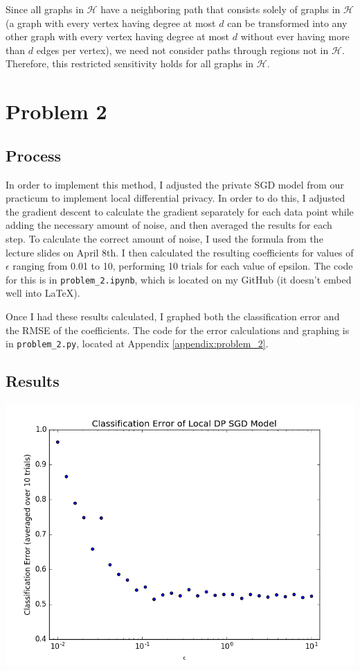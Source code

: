\documentclass[12pt]{article}
\def\cl{\lstinline}
\begin{document}
\bigskip

Since all graphs in $\mathcal{H}$ have a neighboring path that consists solely of graphs in $\mathcal{H}$ (a graph with every vertex having degree at most $d$ can be transformed into any other graph with every vertex having degree at most $d$ without ever having more than $d$ edges per vertex), we need not consider paths through regions not in $\mathcal{H}$. Therefore, this restricted sensitivity holds for all graphs in $\mathcal{H}$.

\newpage

\section{Problem 2}

\subsection{Process}

\noindent

In order to implement this method, I adjusted the private SGD model from our practicum to implement local differential privacy. In order to do this, I adjusted the gradient descent to calculate the gradient separately for each data point while adding the necessary amount of noise, and then averaged the results for each step. To calculate the correct amount of noise, I used the formula from the lecture slides on April 8th. I then calculated the resulting coefficients for values of $\epsilon$ ranging from 0.01 to 10, performing 10 trials for each value of epsilon. The code for this is in \cl{problem_2.ipynb}, which is located on my GitHub (it doesn't embed well into LaTeX).

\bigskip

Once I had these results calculated, I graphed both the classification error and the RMSE of the coefficients. The code for the error calculations and graphing is in \cl{problem_2.py}, located at Appendix \ref{appendix:problem_2}.

\subsection{Results}

\includegraphics[scale=0.7]{classification_error.png}
\end{document}

